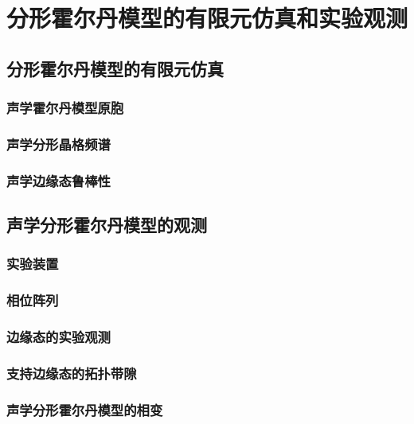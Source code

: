 \chapter{分形霍尔丹模型的有限元仿真和实验观测}
\section{分形霍尔丹模型的有限元仿真}
\subsection{声学霍尔丹模型原胞}
\subsection{声学分形晶格频谱}
\subsection{声学边缘态鲁棒性}
\section{声学分形霍尔丹模型的观测}
\subsection{实验装置}
\subsection{相位阵列}
\subsection{边缘态的实验观测}
\subsection{支持边缘态的拓扑带隙}
\subsection{声学分形霍尔丹模型的相变}
